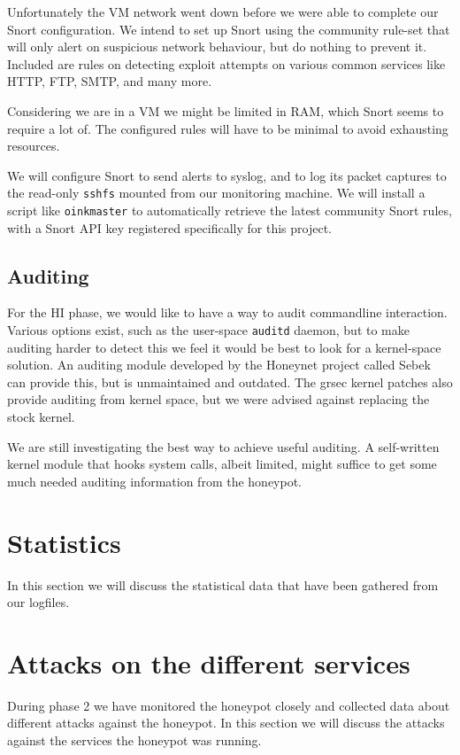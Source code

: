 \documentclass[11pt]{article}
\begin{document}
Unfortunately the VM network went down before we were able to complete our Snort configuration.
We intend to set up Snort using the community rule-set that will only alert on suspicious network behaviour, but do nothing to prevent it. 
Included are rules on detecting exploit attempts on various common services like HTTP, FTP, SMTP, and many more.

Considering we are in a VM we might be limited in RAM, which Snort seems to require a lot of.
The configured rules will have to be minimal to avoid exhausting resources.

We will configure Snort to send alerts to syslog, and to log its packet captures to the read-only \verb|sshfs| mounted from our monitoring machine.
We will install a script like \verb|oinkmaster| to automatically retrieve the latest community Snort rules, with a Snort API key registered specifically for this project.

\subsection{Auditing}
For the HI phase, we would like to have a way to audit commandline interaction. 
Various options exist, such as the user-space \verb|auditd| daemon, but to make auditing harder to detect this we feel it would be best to look for a kernel-space solution.
An auditing module developed by the Honeynet project called Sebek can provide this, but is unmaintained and outdated.
The grsec kernel patches also provide auditing from kernel space, but we were advised against replacing the stock kernel.

We are still investigating the best way to achieve useful auditing.
A self-written kernel module that hooks system calls, albeit limited, might suffice to get some much needed auditing information from the honeypot.


\section{Statistics}
\label{Statistics}
In this section we will discuss the statistical data that have been gathered from our logfiles. 






\section{Attacks on the different services}
\label{Attacks}
During phase 2 we have monitored the honeypot closely and collected data about different attacks against the honeypot. In this section we will discuss the attacks against the services the honeypot was running.
\end{document}
